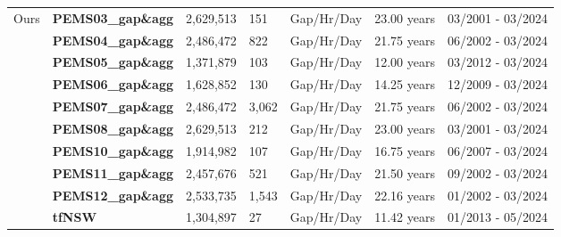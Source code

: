 \begin{table}[!ht]
{\begin{tabular}{c|l|l|l|l|l|l}
\toprule 
\multirow{10}{*}{Ours} & \textbf{PEMS03\_{gap\&agg}} & 2,629,513 & 151 & Gap/Hr/Day & 23.00 years & 03/2001 - 03/2024  \\ \cline{2-7}
& \textbf{PEMS04\_{gap\&agg}} & 2,486,472 & 822 & Gap/Hr/Day & 21.75 years & 06/2002 - 03/2024  \\ \cline{2-7}
& \textbf{PEMS05\_{gap\&agg}} & 1,371,879 & 103 & Gap/Hr/Day & 12.00 years & 03/2012 - 03/2024  \\ \cline{2-7}
& \textbf{PEMS06\_{gap\&agg}} & 1,628,852 & 130 & Gap/Hr/Day & 14.25 years & 12/2009 - 03/2024  \\ \cline{2-7}
& \textbf{PEMS07\_{gap\&agg}} & 2,486,472 & 3,062 & Gap/Hr/Day & 21.75 years & 06/2002 - 03/2024  \\ \cline{2-7}
& \textbf{PEMS08\_{gap\&agg}} & 2,629,513 & 212 & Gap/Hr/Day & 23.00 years & 03/2001 - 03/2024  \\ \cline{2-7}
& \textbf{PEMS10\_{gap\&agg}} & 1,914,982 & 107 & Gap/Hr/Day & 16.75 years & 06/2007 - 03/2024  \\ \cline{2-7}
& \textbf{PEMS11\_{gap\&agg}} & 2,457,676 & 521 & Gap/Hr/Day & 21.50 years & 09/2002 - 03/2024  \\ \cline{2-7}
& \textbf{PEMS12\_{gap\&agg}} & 2,533,735 & 1,543 & Gap/Hr/Day & 22.16 years & 01/2002 - 03/2024  \\ \cline{2-7}
& \textbf{tfNSW} & 1,304,897 & 27 & Gap/Hr/Day & 11.42 years & 01/2013 - 05/2024  \\
\hline
\bottomrule
\end{tabular}}

\label{tab:data1}
\end{table}